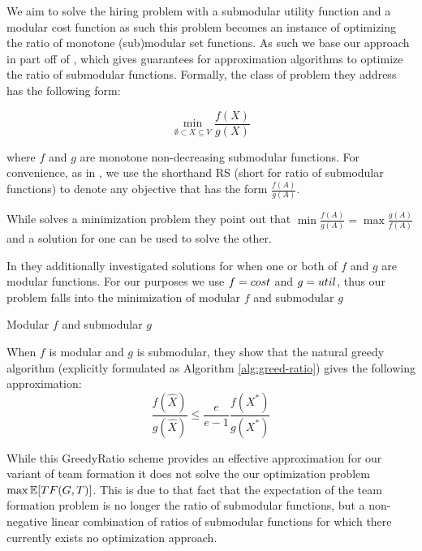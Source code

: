 We aim to solve the hiring problem with a submodular utility function and a modular cost function as such this problem becomes an instance of optimizing the ratio of monotone (sub)modular set functions. As such we base our approach in part off of \cite{bai2016algorithms}, which gives guarantees for approximation algorithms to optimize the ratio of submodular functions.
Formally, the class of problem they address has the following form:

\begin{equation}\label{prob:RS-min}
	\underset{\emptyset \subset X \subseteq V}{\min} \frac{f(X)}{g(X)}
\end{equation}

where $ f $ and $ g $ are monotone non-decreasing submodular functions.
For convenience, as in \cite{bai2016algorithms}, we use the shorthand RS (short for ratio of submodular functions) to denote any objective that has the form $ \frac{f(A)}{g(A)} $.

While \cite{bai2016algorithms} solves a minimization problem they point out that $ \min \frac{f(A)}{g(A)} = \max \frac{g(A)}{f(A)} $ and a solution for one can be used to solve the other. 

In \cite{bai2016algorithms} they additionally investigated solutions for when one or both of $f$ and $g$ are modular functions. For our purposes we use $f=cost$ and $g={util}$, thus our problem falls into the minimization of modular $f$ and submodular $g$ 

\begin{property}
	\label{prop:mod-f-submod-g}
	Modular $ f $ and submodular $ g $
\end{property}

When $ f $ is modular and $ g $ is submodular, they show that the natural greedy algorithm (explicitly formulated as Algorithm \ref{alg:greed-ratio}) gives the following approximation:
\begin{equation}
	\label{eq:greedy-approx}
	\frac{f(\hat{X})}{g(\hat{X})} \leq \frac{e}{e - 1} \frac{f(X^*)}{g(X^*)}
\end{equation}
 



While this GreedyRatio scheme provides an effective approximation for our variant of team formation it does not solve the our optimization problem $\max \mathbb{E}[TF(G,T)]$. This is due to that fact that the expectation of the team formation problem is no longer the ratio of submodular functions, but a non-negative linear combination of ratios of submodular functions for which there currently exists no optimization approach. 


